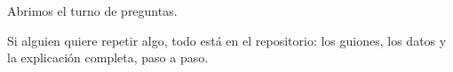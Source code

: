 Abrimos el turno de preguntas.

Si alguien quiere repetir algo, todo está en el repositorio: los guiones, los datos y la explicación completa, paso a paso.
